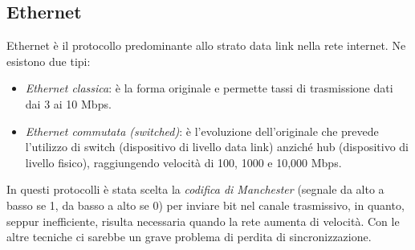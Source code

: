 \documentclass[10pt,a4paper,twoside]{article}
\begin{document}
\subsection{Ethernet}
Ethernet è il protocollo predominante allo strato data link nella rete internet. Ne esistono due tipi:
\begin{itemize}
\item \textit{Ethernet classica}: è la forma originale e permette tassi di trasmissione dati dai 3 ai 10 Mbps.
\item \textit{Ethernet commutata (switched)}: è l'evoluzione dell'originale che prevede l'utilizzo di switch (dispositivo di livello data link) anziché hub (dispositivo di livello fisico), raggiungendo velocità di 100, 1000 e 10,000 Mbps.
\end{itemize}
In questi protocolli è stata scelta la \textit{codifica di Manchester} (segnale da alto a basso se 1, da basso a alto se 0) per inviare bit nel canale trasmissivo, in quanto, seppur inefficiente, risulta necessaria quando la rete aumenta di velocità. Con le altre tecniche ci sarebbe un grave problema di perdita di sincronizzazione.
\end{document}
